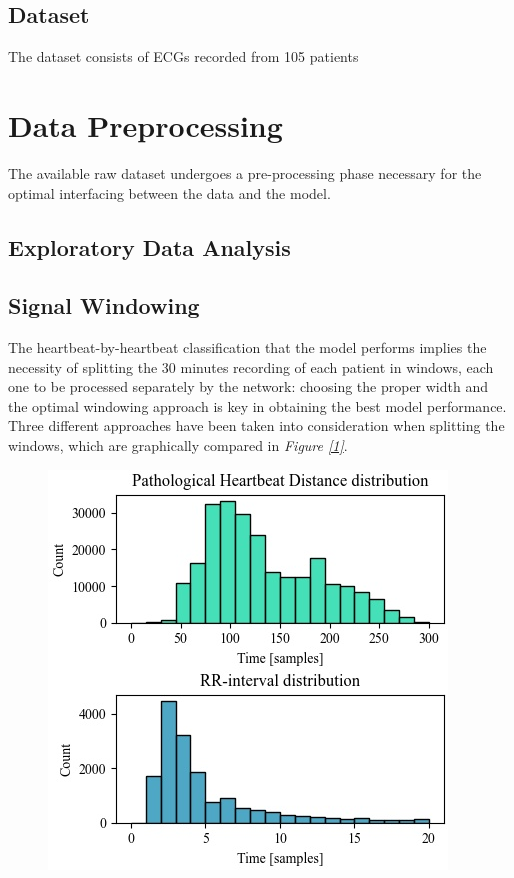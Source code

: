 \documentclass[conference]{IEEEtran}
\newcommand{\fig}[1]{\textit{Figure \ref{1}}}
\begin{document}
\subsection{Dataset}
    The dataset consists of ECGs recorded from 105 patients
\section{Data Preprocessing}
The available raw dataset undergoes a pre-processing phase necessary for the
optimal interfacing between the data and the model.
\subsection{Exploratory Data Analysis}

\subsection{Signal Windowing}
The heartbeat-by-heartbeat classification that the model performs implies the
necessity of splitting the 30 minutes recording of each patient in windows, each
one to be processed separately by the network:
choosing the proper width and the optimal windowing approach is key in
obtaining the best model performance. Three different approaches have been taken
into consideration when splitting the windows, which are graphically compared in
\fig{fig:windows}.
\begin{figure}
    \includegraphics[width=\linewidth]{img/histograms.jpg}
    \label{fig:windows}
\end{figure}
\end{document}
